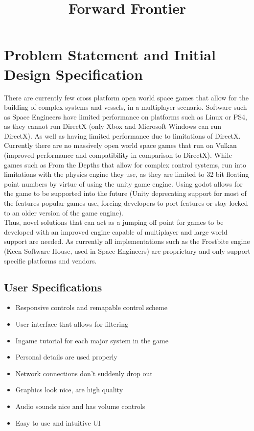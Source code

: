 \documentclass[12pt, DIV=calc]{scrartcl}
\title{Forward Frontier}
\author{\authorid}
\begin{document}
\section{Problem Statement and Initial Design Specification}
There are currently few cross platform open world space games that allow for the building of complex systems and vessels, in a multiplayer scenario. Software such as Space Engineers have limited performance on platforms such as Linux or PS4, as they cannot run DirectX (only Xbox and Microsoft Windows can run DirectX). As well as having limited performance due to limitations of DirectX. Currently there are no massively open world space games that run on Vulkan (improved performance and compatibility in comparison to DirectX). While games such as From the Depths that allow for complex control systems, run into limitations with the physics engine they use, as they are limited to 32 bit floating point numbers by virtue of using the unity game engine. Using godot allows for the game to be supported into the future (Unity deprecating support for most of the features popular games use, forcing developers to port features or stay locked to an older version of the game engine). \\

\noindent Thus, novel solutions that can act as a jumping off point for games to be developed with an improved engine capable of multiplayer and large world support are needed. As currently all implementations such as the Frostbite engine (Keen Software House, used in Space Engineers) are proprietary and only support specific platforms and vendors.
\subsection{User Specifications}
\begin{itemize}
\item Responsive controls and remapable control scheme
\item User interface that allows for filtering
\item Ingame tutorial for each major system in the game
\item Personal details are used properly
\item Network connections don't suddenly drop out
\item Graphics look nice, are high quality
\item Audio sounds nice and has volume controls
\item Easy to use and intuitive UI
\end{itemize}
\end{document}
